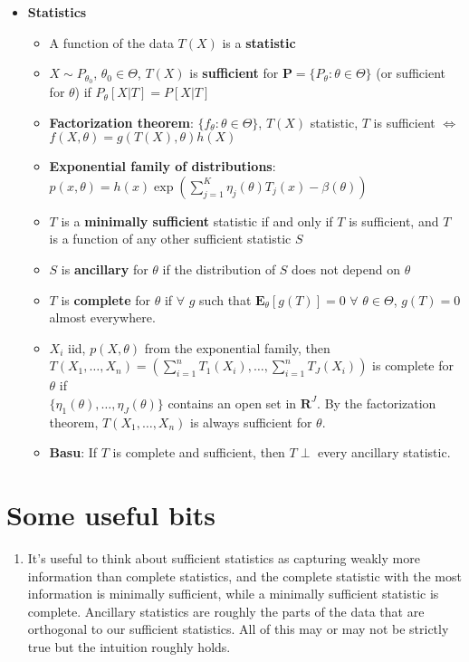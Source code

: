 \documentclass[12pt,english]{article}
\begin{document}
\begin{itemize}
	\item \textbf{Statistics}
	\begin{itemize}
		\item A function of the data $T(X)$ is a \textbf{statistic}
		\item $X \sim P_{\theta_{0}}$, $\theta_{0} \in \Theta$, $T(X)$ is \textbf{sufficient} for $\textbf{P} = \{ P_{\theta} : \theta \in \Theta \}$ (or sufficient for $\theta$) if $P_{\theta}[X | T] = P[X | T]$
		\item \textbf{Factorization theorem}: $\{ f_{\theta} : \theta \in \Theta \}$, $T(X)$ statistic, $T$ is sufficient $\Leftrightarrow$ $f(X, \theta) = g(T(X), \theta) h(X)$
		\item \textbf{Exponential family of distributions}: \\$p(x, \theta) = h(x) \exp( \sum_{j=1}^{K} \eta_{j}(\theta) T_{j}(x) - \beta(\theta))$
		\item $T$ is a \textbf{minimally sufficient} statistic if and only if $T$ is sufficient, and $T$ is a function of any other sufficient statistic $S$
		\item $S$ is \textbf{ancillary} for $\theta$ if the distribution of $S$ does not depend on $\theta$
		\item $T$ is \textbf{complete} for $\theta$ if $\forall$ $g$ such that $\mathbf{E}_{\theta}[g(T)] = 0$ $\forall$ $\theta \in \Theta$, $g(T) = 0$ almost everywhere.
		\item $X_{i}$ iid, $p(X, \theta)$ from the exponential family, then \\$T(X_{1}, \ldots, X_{n}) = \left( \sum_{i=1}^{n} T_{1}(X_{i}), \ldots, \sum_{i=1}^{n} T_{J}(X_{i}) \right)$ is complete for $\theta$ if \\$\{ \eta_{1}(\theta), \ldots, \eta_{J}(\theta) \}$ contains an open set in $\mathbf{R}^{J}$. By the factorization theorem, $T(X_{1}, \ldots, X_{n})$ is always sufficient for $\theta$.
		\item \textbf{Basu}: If $T$ is complete and sufficient, then $T \perp$ every ancillary statistic.
	\end{itemize}
\end{itemize}

\section{Some useful bits}
\begin{enumerate}
	\item It's useful to think about sufficient statistics as capturing weakly more information than complete statistics, and the complete statistic with the most information is minimally sufficient, while a minimally sufficient statistic is complete. Ancillary statistics are roughly the parts of the data that are orthogonal to our sufficient statistics. All of this may or may not be strictly true but the intuition roughly holds.
\end{enumerate}
\end{document}
